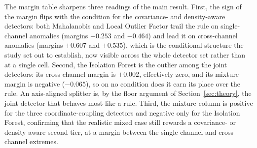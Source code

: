 \documentclass[journal]{IEEEtran}
\begin{document}
The margin table sharpens three readings of the main result. First, the sign of the margin flips with
the condition for the covariance- and density-aware detectors: both Mahalanobis and Local Outlier
Factor trail the rule on single-channel anomalies (margins $-0.253$ and $-0.464$) and lead it on
cross-channel anomalies (margins $+0.607$ and $+0.535$), which is the conditional structure the study
set out to establish, now visible across the whole detector set rather than at a single cell. Second,
the Isolation Forest is the outlier among the joint detectors: its cross-channel margin is $+0.002$,
effectively zero, and its mixture margin is negative ($-0.065$), so on no condition does it earn its
place over the rule. An axis-aligned splitter is, by the floor argument of
Section~\ref{sec:theory}, the joint detector that behaves most like a rule. Third, the mixture column
is positive for the three coordinate-coupling detectors and negative only for the Isolation Forest,
confirming that the realistic mixed case still rewards a covariance- or density-aware second tier, at
a margin between the single-channel and cross-channel extremes.
\end{document}
